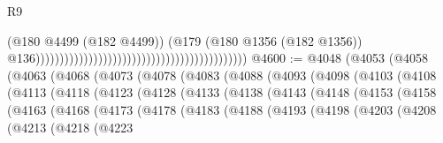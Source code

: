 \begin{lexlean}{R9}
\begin{coremodule}
                                                                                          (@180
                                                                                            @4499
                                                                                            (@182
                                                                                              @4499))
                                                                                          (@179
                                                                                            (@180
                                                                                              @1356
                                                                                              (@182
                                                                                                @1356))
                                                                                            @136))))))))))))))))))))))))))))))))))))))))))))
@4600 := @4048
    (@4053
      (@4058
        (@4063
          (@4068
            (@4073
              (@4078
                (@4083
                  (@4088
                    (@4093
                      (@4098
                        (@4103
                          (@4108
                            (@4113
                              (@4118
                                (@4123
                                  (@4128
                                    (@4133
                                      (@4138
                                        (@4143
                                          (@4148
                                            (@4153
                                              (@4158
                                                (@4163
                                                  (@4168
                                                    (@4173
                                                      (@4178
                                                        (@4183
                                                          (@4188
                                                            (@4193
                                                              (@4198
                                                                (@4203
                                                                  (@4208
                                                                    (@4213
                                                                      (@4218
                                                                        (@4223

\end{coremodule}
\end{lexlean}
